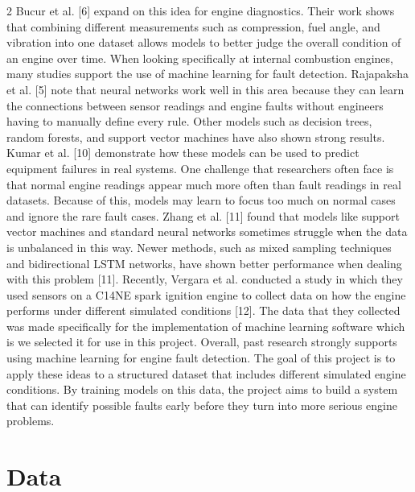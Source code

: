\documentclass[10pt, letterpaper]{article}
\begin{document}
\begin{multicols}{2}
Bucur et al. [6] expand on this idea for engine diagnostics. Their work shows that combining
different measurements such as compression, fuel angle, and vibration into one dataset allows
models to better judge the overall condition of an engine over time.
When looking specifically at internal combustion engines, many studies support the use
of machine learning for fault detection. Rajapaksha et al. [5] note that neural networks work well
in this area because they can learn the connections between sensor readings and engine faults
without engineers having to manually define every rule. Other models such as decision trees,
random forests, and support vector machines have also shown strong results. Kumar et al. [10]
demonstrate how these models can be used to predict equipment failures in real systems.
One challenge that researchers often face is that normal engine readings appear much
more often than fault readings in real datasets. Because of this, models may learn to focus too
much on normal cases and ignore the rare fault cases. Zhang et al. [11] found that models like
support vector machines and standard neural networks sometimes struggle when the data is
unbalanced in this way. Newer methods, such as mixed sampling techniques and bidirectional
LSTM networks, have shown better performance when dealing with this problem [11]. Recently, Vergara et al. conducted a study in which they used sensors on a C14NE spark ignition engine to collect data on how the engine performs under different simulated conditions [12]. The data that they collected was made specifically for the implementation of machine learning software which is we selected it for use in this project. 
Overall, past research strongly supports using machine learning for engine fault
detection. The goal of this project is to apply these ideas to a structured dataset that includes
 different simulated engine conditions. By training models on this data,
the project aims to build a system that can identify possible faults early before they turn into
more serious engine problems.

\section{Data}


\end{multicols}
\end{document}
